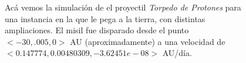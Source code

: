 \begin{figure}
{	\label{fig:res_misil_3}
	}
	\caption{
		Acá vemos la simulación de el proyectil \textit{Torpedo de Protones} para una instancia en la que le pega a la tierra,
		con distintas ampliaciones.
		El misil fue disparado desde el punto $<-30,.005, 0>$ AU (aproximadamente) a una velocidad de $<0.147774,0.00480309,-3.62451e-08>$ AU/día.
	}
	\label{ fig:res_misil }
\end{figure}
